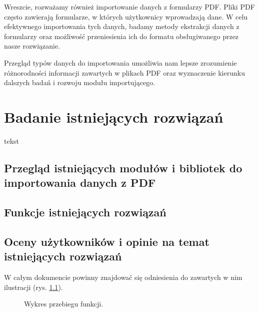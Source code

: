 \documentclass[a4paper,twoside,12pt]{book}
\begin{document}
Wreszcie, rozważamy również importowanie danych z formularzy PDF. Pliki PDF często zawierają formularze, w których użytkownicy wprowadzają dane. W celu efektywnego importowania tych danych, badamy metody ekstrakcji danych z formularzy oraz możliwość przeniesienia ich do formatu obsługiwanego przez nasze rozwiązanie.

Przegląd typów danych do importowania umożliwia nam lepsze zrozumienie różnorodności informacji zawartych w plikach PDF oraz wyznaczenie kierunku dalszych badań i rozwoju modułu importującego.


\chapter{Badanie istniejących rozwiązań} 

tekst

\section{Przegląd istniejących modułów i bibliotek do importowania danych z PDF}

\section{Funkcje istniejących rozwiązań}

\section{Oceny użytkowników i opinie na temat istniejących rozwiązań}

W całym dokumencie powinny znajdować się odniesienia do zawartych w nim ilustracji (rys. \ref{fig:2}).

\begin{figure}
\centering
{}
\caption{Wykres przebiegu funkcji.} %
\label{fig:2}
\end{figure}
\end{document}
